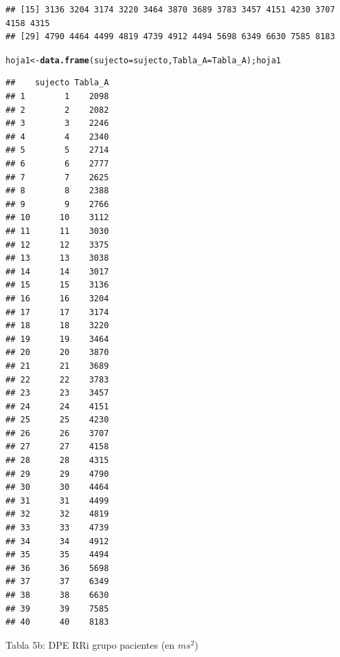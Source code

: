 \documentclass[12pt,letterpaper]{article}\usepackage[]{graphicx}\usepackage[]{color}
\makeatletter
\newcommand{\hlstd}[1]{\textcolor[rgb]{0.345,0.345,0.345}{#1}}%
\newcommand{\hlkwb}[1]{\textcolor[rgb]{0.69,0.353,0.396}{#1}}%
\newcommand{\hlkwc}[1]{\textcolor[rgb]{0.333,0.667,0.333}{#1}}%
\newcommand{\hlkwd}[1]{\textcolor[rgb]{0.737,0.353,0.396}{\textbf{#1}}}%
\newenvironment{kframe}{%
 \def\at@end@of@kframe{}%
 \ifinner\ifhmode%
  \def\at@end@of@kframe{\end{minipage}}%
  \begin{minipage}{\columnwidth}%
 \fi\fi%
 \def\FrameCommand##1{\hskip\@totalleftmargin \hskip-\fboxsep
 \colorbox{shadecolor}{##1}\hskip-\fboxsep
     \hskip-\linewidth \hskip-\@totalleftmargin \hskip\columnwidth}%
 \MakeFramed {\advance\hsize-\width
   \@totalleftmargin\z@ \linewidth\hsize
   \@setminipage}}%
 {\par\unskip\endMakeFramed%
 \at@end@of@kframe}
\newenvironment{knitrout}{}{} %
\makeatother
\begin{document}
\begin{knitrout}
\begin{kframe}
\begin{verbatim}
## [15] 3136 3204 3174 3220 3464 3870 3689 3783 3457 4151 4230 3707 4158 4315
## [29] 4790 4464 4499 4819 4739 4912 4494 5698 6349 6630 7585 8183
\end{verbatim}
\begin{alltt}
\hlstd{hoja1} \hlkwb{<-} \hlkwd{data.frame}\hlstd{(}\hlkwc{sujecto}\hlstd{=sujecto,} \hlkwc{Tabla_A}\hlstd{=Tabla_A); hoja1}
\end{alltt}
\begin{verbatim}
##    sujecto Tabla_A
## 1        1    2098
## 2        2    2082
## 3        3    2246
## 4        4    2340
## 5        5    2714
## 6        6    2777
## 7        7    2625
## 8        8    2388
## 9        9    2766
## 10      10    3112
## 11      11    3030
## 12      12    3375
## 13      13    3038
## 14      14    3017
## 15      15    3136
## 16      16    3204
## 17      17    3174
## 18      18    3220
## 19      19    3464
## 20      20    3870
## 21      21    3689
## 22      22    3783
## 23      23    3457
## 24      24    4151
## 25      25    4230
## 26      26    3707
## 27      27    4158
## 28      28    4315
## 29      29    4790
## 30      30    4464
## 31      31    4499
## 32      32    4819
## 33      33    4739
## 34      34    4912
## 35      35    4494
## 36      36    5698
## 37      37    6349
## 38      38    6630
## 39      39    7585
## 40      40    8183
\end{verbatim}
\end{kframe}
\end{knitrout}

\begin{center}
Tabla 5b: DPE RRi grupo pacientes (en $ms^2$)
\end{center}
\end{document}
